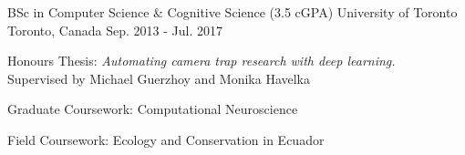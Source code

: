 

\begin{cventries}

  \cventry
    {BSc in Computer Science \& Cognitive Science (3.5 cGPA)} %
    {University of Toronto} %
    {Toronto, Canada} %
    {Sep. 2013 - Jul. 2017} %
    {
      \begin{cvitems} %
        \item {Honours Thesis: \textit{Automating camera trap research with deep learning.} \\
        Supervised by Michael Guerzhoy and Monika Havelka}
        \item{Graduate Coursework: Computational Neuroscience}
        \item{Field Coursework: Ecology and Conservation in Ecuador}
      \end{cvitems}
    }
    {}

\end{cventries}
